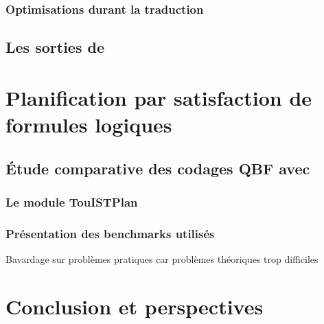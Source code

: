 \documentclass[a4paper,12pt,oneside]{extbook}
\begin{document}
\subsection{Optimisations durant la traduction}
\section{Les sorties de \touist}


\chapter{Planification par satisfaction de formules logiques}


\section{Étude comparative des codages QBF avec \touist} %

\subsection{Le module TouISTPlan}


\subsection{Présentation des benchmarks utilisés}
Bavardage sur problèmes pratiques car problèmes théoriques trop difficiles









\chapter{Conclusion et perspectives}\label{chap:conclusion}




\appendix

\printbibliography
\end{document}
